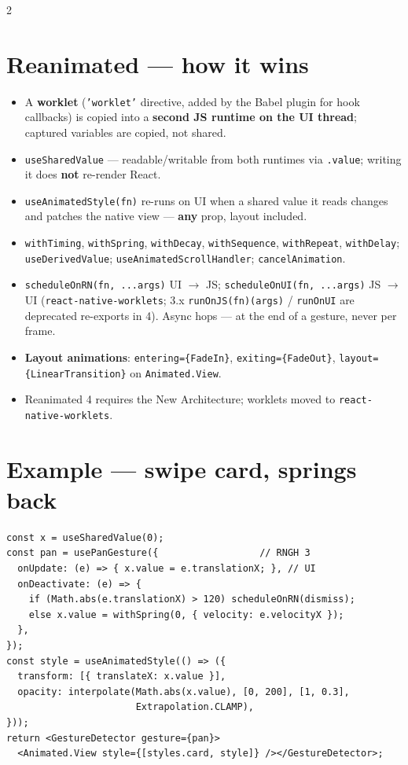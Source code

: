 \documentclass[8pt]{extarticle}
\begin{document}
\begin{multicols}{2}
\section{Reanimated — how it wins}
\begin{itemize}
  \item A \textbf{worklet} (\texttt{'worklet'} directive, added by the Babel plugin
        for hook callbacks) is copied into a \textbf{second JS runtime on the UI
        thread}; captured variables are copied, not shared.
  \item \texttt{useSharedValue} — readable/writable from both runtimes via
        \texttt{.value}; writing it does \textbf{not} re-render React.
  \item \texttt{useAnimatedStyle(fn)} re-runs on UI when a shared value it reads
        changes and patches the native view — \textbf{any} prop, layout included.
  \item \texttt{withTiming}, \texttt{withSpring}, \texttt{withDecay}, \texttt{withSequence},
        \texttt{withRepeat}, \texttt{withDelay}; \texttt{useDerivedValue};
        \texttt{useAnimated}\allowbreak\texttt{ScrollHandler}; \texttt{cancelAnimation}.
  \item \texttt{scheduleOnRN(fn, ...args)} UI $\to$ JS; \texttt{scheduleOnUI(fn, ...args)} JS
        $\to$ UI (\texttt{react-native-worklets}; 3.x \texttt{runOnJS(fn)(args)} /
        \texttt{runOnUI} are deprecated re-exports in 4). Async hops — at the end of a
        gesture, never per frame.
  \item \textbf{Layout animations}: \texttt{entering=\{FadeIn\}}, \texttt{exiting=\{FadeOut\}},
        \texttt{layout=\{LinearTransition\}} on \texttt{Animated.View}.
  \item Reanimated 4 requires the New Architecture; worklets moved to
        \texttt{react-native-worklets}.
\end{itemize}

\columnbreak

\section{Example — swipe card, springs back}
\begin{lstlisting}[language=TSSheet]
const x = useSharedValue(0);
const pan = usePanGesture({                  // RNGH 3
  onUpdate: (e) => { x.value = e.translationX; }, // UI
  onDeactivate: (e) => {
    if (Math.abs(e.translationX) > 120) scheduleOnRN(dismiss);
    else x.value = withSpring(0, { velocity: e.velocityX });
  },
});
const style = useAnimatedStyle(() => ({
  transform: [{ translateX: x.value }],
  opacity: interpolate(Math.abs(x.value), [0, 200], [1, 0.3],
                       Extrapolation.CLAMP),
}));
return <GestureDetector gesture={pan}>
  <Animated.View style={[styles.card, style]} /></GestureDetector>;
\end{lstlisting}


\end{multicols}
\end{document}
